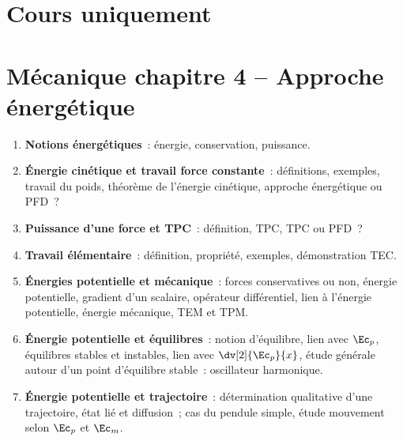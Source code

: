 \documentclass[a4paper, 12pt, final, garamond]{book}
\begin{document}
\section{Cours uniquement}
\section*{Mécanique chapitre 4 -- Approche énergétique}
\begin{enumerate}[label=\Roman*]
    \item \textbf{Notions énergétiques}~: énergie, conservation, puissance.
    \item \textbf{Énergie cinétique et travail force constante}~: définitions,
        exemples, travail du poids, théorème de l'énergie cinétique, approche
        énergétique ou PFD~?
    \item \textbf{Puissance d'une force et TPC}~: définition, TPC, TPC ou PFD~?
    \item \textbf{Travail élémentaire}~: définition, propriété, exemples,
        démonstration TEC.
    \item \textbf{Énergies potentielle et mécanique}~: forces conservatives ou
        non, énergie potentielle, gradient d'un scalaire, opérateur
        différentiel, lien à l'énergie potentielle, énergie mécanique, TEM et
        TPM.
    \item \textbf{Énergie potentielle et équilibres}~: notion d'équilibre, lien
        avec $\Ec_p$, équilibres stables et instables, lien avec
        $\dv[2]{\Ec_p}{x}$, étude générale autour d'un point d'équilibre
        stable~: oscillateur harmonique.
    \item \textbf{Énergie potentielle et trajectoire}~: détermination
        qualitative d'une trajectoire, état lié et diffusion~; cas du pendule
        simple, étude mouvement selon $\Ec_p$ et $\Ec_m$.
\end{enumerate}
\end{document}
